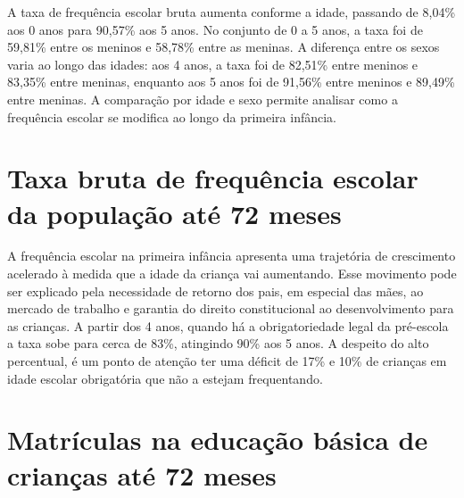 
A taxa de frequência escolar bruta aumenta conforme a idade, passando de 8,04\% aos 0 anos para 90,57\% aos 5 anos. No conjunto de 0 a 5 anos, a taxa foi de 59,81\% entre os meninos e 58,78\% entre as meninas. A diferença entre os sexos varia ao longo das idades: aos 4 anos, a taxa foi de 82,51\% entre meninos e 83,35\% entre meninas, enquanto aos 5 anos foi de 91,56\% entre meninos e 89,49\% entre meninas. A comparação por idade e sexo permite analisar como a frequência escolar se modifica ao longo da primeira infância.


\section{Taxa bruta de frequência escolar da população até 72 meses}


A frequência escolar na primeira infância apresenta uma trajetória de crescimento acelerado à medida que a idade da criança vai aumentando. Esse movimento pode ser explicado pela necessidade de retorno dos pais, em especial das mães, ao mercado de trabalho e garantia do direito constitucional ao desenvolvimento para as crianças. A partir dos 4 anos, quando há a obrigatoriedade legal da pré-escola a taxa sobe para cerca de 83\%, atingindo 90\% aos 5 anos. A despeito do alto percentual, é um ponto de atenção ter uma déficit de 17\% e 10\% de crianças em idade escolar obrigatória que não a estejam frequentando.


\section{Matrículas na educação básica de crianças até 72 meses}


